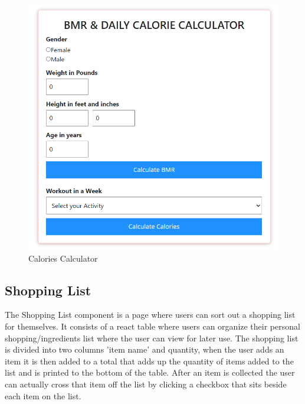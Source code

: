 \begin{center}
  \begin{figure}[H]
    \includegraphics[width=\textwidth]{img/bmrcalc.png}
    \caption{Calories Calculator}
    \label{fig: Image of Calories Calculator}
  \end{figure}
\end{center}

\subsection{Shopping List}

The Shopping List component is a page where users can sort out a shopping list for themselves. It consists of a react table where users can organize their personal shopping/ingredients list where the user can view for later use. The shopping list is divided into two columns 'item name' and quantity, when the user adds an item it is then added to a total that adds up the quantity of items added to the list and is printed to the bottom of the table. After an item is collected the user can actually cross that item off the list by clicking a checkbox that sits beside each item on the list.

